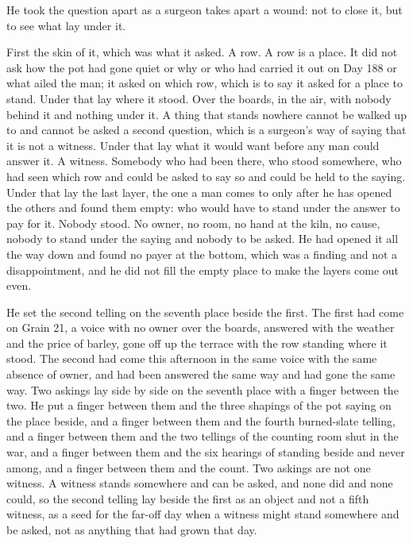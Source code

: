 He took the question apart as a surgeon takes apart a wound: not to close it, but to see what lay under it.

First the skin of it, which was what it asked. A row. A row is a place. It did not ask how the pot had gone quiet or why or who had carried it out on Day 188 or what ailed the man; it asked on which row, which is to say it asked for a place to stand. Under that lay where it stood. Over the boards, in the air, with nobody behind it and nothing under it. A thing that stands nowhere cannot be walked up to and cannot be asked a second question, which is a surgeon's way of saying that it is not a witness. Under that lay what it would want before any man could answer it. A witness. Somebody who had been there, who stood somewhere, who had seen which row and could be asked to say so and could be held to the saying. Under that lay the last layer, the one a man comes to only after he has opened the others and found them empty: who would have to stand under the answer to pay for it. Nobody stood. No owner, no room, no hand at the kiln, no cause, nobody to stand under the saying and nobody to be asked. He had opened it all the way down and found no payer at the bottom, which was a finding and not a disappointment, and he did not fill the empty place to make the layers come out even.

He set the second telling on the seventh place beside the first. The first had come on Grain 21, a voice with no owner over the boards, answered with the weather and the price of barley, gone off up the terrace with the row standing where it stood. The second had come this afternoon in the same voice with the same absence of owner, and had been answered the same way and had gone the same way. Two askings lay side by side on the seventh place with a finger between the two. He put a finger between them and the three shapings of the pot saying on the place beside, and a finger between them and the fourth burned-slate telling, and a finger between them and the two tellings of the counting room shut in the war, and a finger between them and the six hearings of  standing beside and never among, and a finger between them and the count. Two askings are not one witness. A witness stands somewhere and can be asked, and none did and none could, so the second telling lay beside the first as an object and not a fifth witness, as a seed for the far-off day when a witness might stand somewhere and be asked, not as anything that had grown that day.


